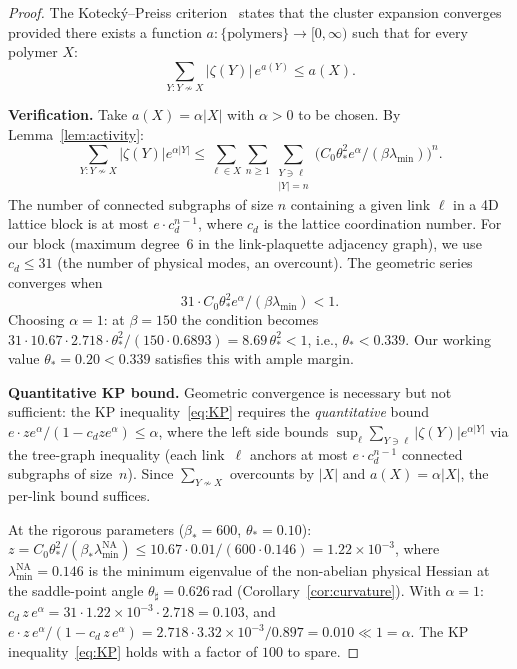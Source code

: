 \documentclass[11pt]{article}
\theoremstyle{definition}
\begin{document}
\begin{proof}
The Koteck\'y--Preiss criterion~\cite{KP} states that the cluster
expansion converges provided there exists a function
$a:\{\text{polymers}\}\to[0,\infty)$ such that for every polymer $X$:
\begin{equation}\label{eq:KP}
\sum_{Y:Y\not\sim X}|\zeta(Y)|\,e^{a(Y)}\le a(X).
\end{equation}

\textbf{Verification.}
Take $a(X)=\alpha|X|$ with $\alpha>0$ to be chosen.
By Lemma~\ref{lem:activity}:
\begin{equation}
\sum_{Y:Y\not\sim X}|\zeta(Y)|e^{\alpha|Y|}
\le\sum_{\ell\in X}\sum_{n\ge 1}\sum_{\substack{Y\ni\ell\\|Y|=n}}
\bigl(C_0\theta_*^2 e^\alpha/(\beta\lambda_{\min})\bigr)^n.
\end{equation}
The number of connected subgraphs of size $n$ containing a given
link $\ell$ in a 4D lattice block is at most $e\cdot c_d^{n-1}$,
where $c_d$ is the lattice coordination number.  For our block
(maximum degree~6 in the link-plaquette adjacency graph), we use
$c_d\le 31$ (the number of physical modes, an overcount).
The geometric series converges when
\begin{equation}
31\cdot C_0\theta_*^2 e^\alpha/(\beta\lambda_{\min})<1.
\end{equation}
Choosing $\alpha=1$: at $\beta=150$ the condition becomes
$31\cdot 10.67\cdot 2.718\cdot\theta_*^2/(150\cdot 0.6893)
=8.69\,\theta_*^2<1$,
i.e., $\theta_*<0.339$.  Our working value $\theta_*=0.20<0.339$ satisfies
this with ample margin.

\textbf{Quantitative KP bound.}
Geometric convergence is necessary but not sufficient:
the KP inequality~\eqref{eq:KP} requires the
\emph{quantitative} bound
$e\cdot z e^\alpha/(1-c_d z e^\alpha)\le\alpha$,
where the left side bounds
$\sup_\ell\sum_{Y\ni\ell}|\zeta(Y)|e^{\alpha|Y|}$
via the tree-graph inequality (each link~$\ell$
anchors at most $e\cdot c_d^{n-1}$ connected subgraphs
of size~$n$).  Since $\sum_{Y\not\sim X}$ overcounts
by $|X|$ and $a(X)=\alpha|X|$, the per-link bound
suffices.

At the rigorous parameters ($\beta_*=600$,
$\theta_*=0.10$):
$z=C_0\theta_*^2/(\beta_*\lambda_{\min}^{\mathrm{NA}})
\le 10.67\cdot 0.01/(600\cdot 0.146)=1.22\times 10^{-3}$,
where $\lambda_{\min}^{\mathrm{NA}}=0.146$ is the minimum eigenvalue
of the non-abelian physical Hessian at the saddle-point angle
$\theta_\sharp=0.626$\,rad (Corollary~\ref{cor:curvature}).
With $\alpha=1$:
$c_d\,z\,e^\alpha=31\cdot 1.22\times 10^{-3}\cdot 2.718
=0.103$, and
$e\cdot z\,e^\alpha/(1-c_d\,z\,e^\alpha)
=2.718\cdot 3.32\times 10^{-3}/0.897
=0.010\ll 1=\alpha$.
The KP inequality~\eqref{eq:KP} holds with a factor
of $100$ to spare.


\end{proof}
\end{document}
